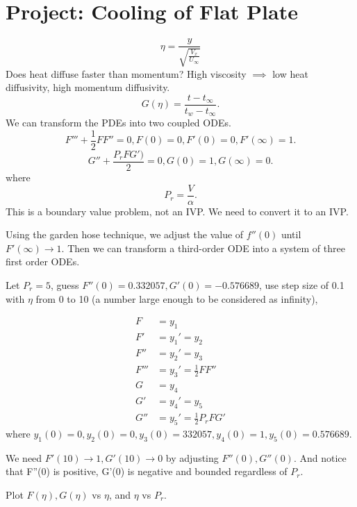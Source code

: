 \documentclass[class=article, crop=false]{standalone}
\theoremstyle{plain}
\theoremstyle{remark}
\begin{document}
\section{Project: Cooling of Flat Plate}

\[\eta = \frac{y}{\sqrt{\frac{V_x}{U_\infty}} }\]
Does heat diffuse faster than momentum? High viscosity $\implies$ low heat diffusivity, high momentum diffusivity.
\[
	G(\eta)=\frac{t-t_\infty}{t_w-t_\infty}
.\] 
We can transform the PDEs into two coupled ODEs.
\[
	F'''+\frac{1}{2}F F''=0, F(0)=0, F'(0)=0, F'(\infty)=1
.\] 
\[
	G'' + \frac{P_r F G')}{2} =0, G(0)=1,G(\infty)=0
.\] 
where \[
P_r = \frac{V}{\alpha}
.\]
This is a boundary value problem, not an IVP. We need to convert it to an IVP.

Using the garden hose technique, we adjust the value of $f''(0)$ until  $F'(\infty) \to 1$. Then we can transform a third-order ODE into a system of three first order ODEs. 

Let $P_r=5$, guess $F''(0)=0.332057, G'(0)=-0.576689$,  use step size of 0.1 with $\eta$ from 0 to 10 (a number large enough to be considered as infinity), 

\begin{equation*}
\begin{split}
	F&= y_1 \\
	F'&= y_1'=y_2 \\
	F''&= y_2'=y_3 \\
	F'''&= y_3'=\frac{1}{2}F F'' \\
	G&= y_4 \\
	G'&= y_4'=y_5 \\
	G''&=y_5'=\frac{1}{2}P_r F G'
\end{split}
\end{equation*}
where $y_1(0)=0,y_2(0)=0,y_3(0)=332057, y_4(0)=1,y_5(0)=0.576689$.

We need $F'(10) \to 1, G'(10) \to 0$ by adjusting $F''(0),G''(0)$. And notice that F''(0) is positive, G'(0) is negative  and bounded regardless of $P_r$.

Plot $F(\eta),G(\eta)$ vs  $\eta$, and  $\eta$ vs  $P_r$.
\end{document}
